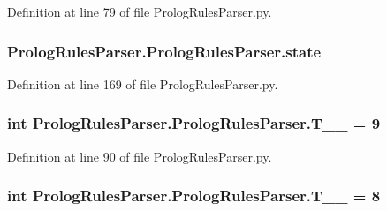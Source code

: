 Definition at line 79 of file Prolog\+Rules\+Parser.\+py.

\hypertarget{class_prolog_rules_parser_1_1_prolog_rules_parser_a250a340ccf9e9fcefe5b2e8b4197385f}{}
\subsubsection[{state}]{\setlength{\rightskip}{0pt plus 5cm}Prolog\+Rules\+Parser.\+Prolog\+Rules\+Parser.\+state}\label{class_prolog_rules_parser_1_1_prolog_rules_parser_a250a340ccf9e9fcefe5b2e8b4197385f}


Definition at line 169 of file Prolog\+Rules\+Parser.\+py.

\hypertarget{class_prolog_rules_parser_1_1_prolog_rules_parser_af3c084e99302eea5776f20c1d6ee9a6f}{}
\subsubsection[{T\+\_\+\+\_\+0}]{\setlength{\rightskip}{0pt plus 5cm}int Prolog\+Rules\+Parser.\+Prolog\+Rules\+Parser.\+T\+\_\+\+\_ = 9\hspace{0.3cm}{\ttfamily [static]}}\label{class_prolog_rules_parser_1_1_prolog_rules_parser_af3c084e99302eea5776f20c1d6ee9a6f}


Definition at line 90 of file Prolog\+Rules\+Parser.\+py.

\hypertarget{class_prolog_rules_parser_1_1_prolog_rules_parser_ab7ff2effb1ea8358d127c79c272e68c2}{}
\subsubsection[{T\+\_\+\+\_\+1}]{\setlength{\rightskip}{0pt plus 5cm}int Prolog\+Rules\+Parser.\+Prolog\+Rules\+Parser.\+T\+\_\+\+\_ = 8\hspace{0.3cm}{\ttfamily [static]}}\label{class_prolog_rules_parser_1_1_prolog_rules_parser_ab7ff2effb1ea8358d127c79c272e68c2}


